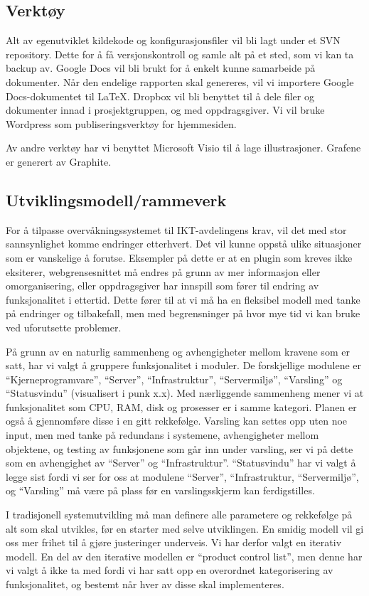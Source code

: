 \subsection{Verktøy}
Alt av egenutviklet kildekode og konfigurasjonsfiler vil bli lagt under et SVN repository. Dette for å få versjonskontroll og samle alt på et sted, som vi kan ta backup av. Google Docs vil bli brukt for å enkelt kunne samarbeide på dokumenter. Når den endelige rapporten skal genereres, vil vi importere Google Docs-dokumentet til LaTeX. Dropbox vil bli benyttet til å dele filer og dokumenter innad i prosjektgruppen, og med oppdragsgiver. Vi vil bruke Wordpress som publiseringsverktøy for hjemmesiden.

Av andre verktøy har vi benyttet Microsoft Visio til å lage illustrasjoner. Grafene er generert av Graphite.

\subsection{Utviklingsmodell/rammeverk}
For å tilpasse overvåkningssystemet til IKT-avdelingens krav, vil det med stor sannsynlighet komme endringer etterhvert. Det vil kunne oppstå ulike situasjoner som er vanskelige å forutse. Eksempler på dette er at en plugin som kreves ikke eksiterer, webgrensesnittet må endres på grunn av mer informasjon eller omorganisering, eller oppdragsgiver har innspill som fører til endring av funksjonalitet i ettertid. Dette fører til at vi må ha en fleksibel modell med tanke på endringer og tilbakefall, men med begrensninger på hvor mye tid vi kan bruke ved uforutsette problemer.

På grunn av en naturlig sammenheng og avhengigheter mellom kravene som er satt, har vi valgt å gruppere funksjonalitet i moduler. De forskjellige modulene er “Kjerneprogramvare”, “Server”, “Infrastruktur”, “Servermiljø”, “Varsling” og “Statusvindu” (visualisert i punk x.x). Med nærliggende sammenheng mener vi at funksjonalitet som CPU, RAM, disk og prosesser er i samme kategori. Planen er også å gjennomføre disse i en gitt rekkefølge. Varsling kan settes opp uten noe input, men med tanke på redundans i systemene, avhengigheter mellom objektene, og testing av funksjonene som går inn under varsling, ser vi på dette som en avhengighet av “Server” og “Infrastruktur”. “Statusvindu” har vi valgt å legge sist fordi vi ser for oss at modulene “Server”, “Infrastruktur, “Servermiljø”, og “Varsling” må være på plass før en varslingsskjerm kan ferdigstilles.

I tradisjonell systemutvikling må man definere alle parametere og rekkefølge på alt som skal utvikles, før en starter med selve utviklingen. En smidig modell vil gi oss mer frihet til å gjøre justeringer underveis. Vi har derfor valgt en iterativ modell\cite{wiki:iterativ}. En del av den iterative modellen er “product control list”, men denne har vi valgt å ikke ta med fordi vi har satt opp en overordnet kategorisering av funksjonalitet, og bestemt når hver av disse skal implementeres.

